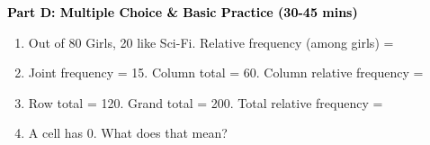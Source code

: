 \documentclass[12pt, letterpaper, fleqn]{article}
\newcommand{\blank}{\underline{\hspace{2.2cm}}}
\begin{document}
\newpage

\begin{tcolorbox}[colback=customteal!20]
\large\textcolor{black}{\textbf{Part D: Multiple Choice \& Basic Practice (30-45 mins)}}
\end{tcolorbox}

\vspace{3mm}

\begin{enumerate}[itemsep=2.5cm, leftmargin=0.6cm, resume]
\item Out of 80 Girls, 20 like Sci-Fi. Relative frequency (among girls) = \blank
\item Joint frequency = 15. Column total = 60. Column relative frequency = \blank
\item Row total = 120. Grand total = 200. Total relative frequency = \blank
\item A cell has 0. What does that mean? \blank
\end{enumerate}
\end{document}
